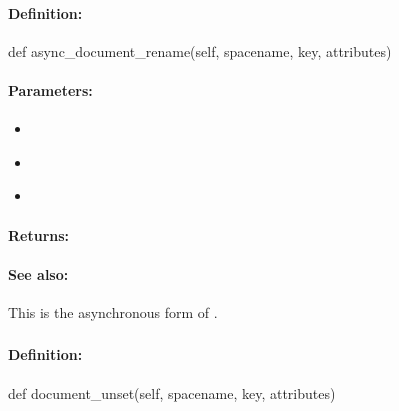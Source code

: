 \paragraph{Definition:}
\begin{pythoncode}
def async_document_rename(self, spacename, key, attributes)
\end{pythoncode}

\paragraph{Parameters:}
\begin{itemize}[noitemsep]
\item {}\\

\item {}\\

\item {}\\

\end{itemize}

\paragraph{Returns:}


\paragraph{See also:}  This is the asynchronous form of .

\pagebreak
\subsubsection{}
\label{api:python:document_unset}


\paragraph{Definition:}
\begin{pythoncode}
def document_unset(self, spacename, key, attributes)
\end{pythoncode}

